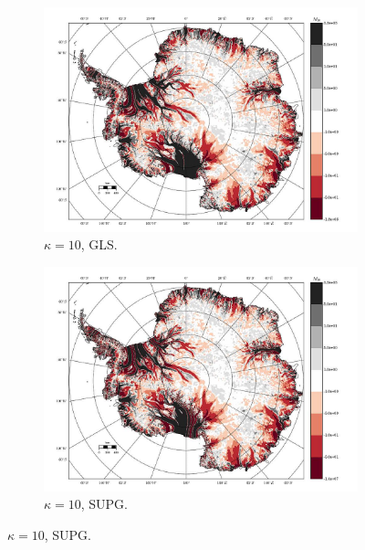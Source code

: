 \begin{figure}
  \begin{subfigure}[b]{0.45\linewidth}
    \includegraphics[width=\linewidth]{images/balance_velocity/antarctica/d_U_ob_S/misfit_10H_kappa_10_GLS.jpg}
  \caption{$\kappa = 10$, GLS.}
  \label{antarctica_bv_image_kappa_5_GLS_U_ob_S_misfit}
  \end{subfigure}
  \begin{subfigure}[b]{0.45\linewidth}
    \includegraphics[width=\linewidth]{images/balance_velocity/antarctica/d_U_ob_S/misfit_10H_kappa_10_SUPG.jpg}
  \caption{$\kappa = 10$, SUPG.}
  \label{antarctica_bv_image_kappa_5_SUPG_U_ob_S_misfit}
  \end{subfigure}
  

\end{figure}
